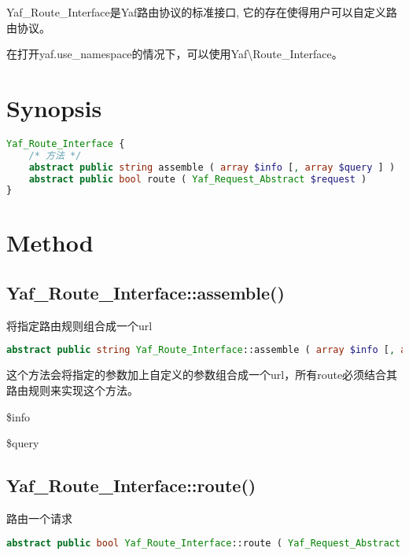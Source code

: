 Yaf\_Route\_Interface是Yaf路由协议的标准接口, 它的存在使得用户可以自定义路由协议。

在打开yaf.use\_namespace的情况下，可以使用Yaf\textbackslash Route\_Interface。



\section{Synopsis}



\begin{lstlisting}[language=PHP]
Yaf_Route_Interface {
    /* 方法 */
    abstract public string assemble ( array $info [, array $query ] )
    abstract public bool route ( Yaf_Request_Abstract $request )
}
\end{lstlisting}

\section{Method}

\subsection{Yaf\_Route\_Interface::assemble()}

将指定路由规则组合成一个url



\begin{lstlisting}[language=PHP]
abstract public string Yaf_Route_Interface::assemble ( array $info [, array $query ] )
\end{lstlisting}

这个方法会将指定的参数加上自定义的参数组合成一个url，所有route必须结合其路由规则来实现这个方法。

\begin{compactitem}
\item \$info
\item \$query
\end{compactitem}




\subsection{Yaf\_Route\_Interface::route()}

路由一个请求


\begin{lstlisting}[language=PHP]
abstract public bool Yaf_Route_Interface::route ( Yaf_Request_Abstract $request )
\end{lstlisting}


